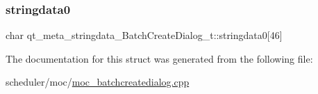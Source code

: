 \subsubsection{\texorpdfstring{stringdata0}{stringdata0}}
{\footnotesize\ttfamily char qt\+\_\+meta\+\_\+stringdata\+\_\+\+Batch\+Create\+Dialog\+\_\+t\+::stringdata0\mbox{[}46\mbox{]}}



The documentation for this struct was generated from the following file\+:\begin{DoxyCompactItemize}
\item 
scheduler/moc/\mbox{\hyperlink{moc__batchcreatedialog_8cpp}{moc\+\_\+batchcreatedialog.\+cpp}}\end{DoxyCompactItemize}
